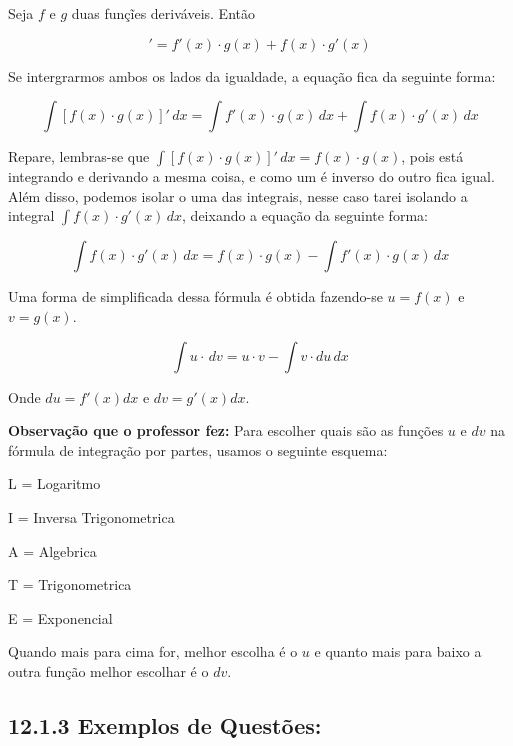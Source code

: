 \documentclass[article,12pt,oneside,a4paper,brazil]{abntex2}
\begin{document}
	\begin{flushleft}
		Seja $f$ e $g$ duas funçĩes deriváveis. Então
		
		\begin{equation*}
			[f(x) \cdot g(x)]' = f'(x) \cdot g(x) + f(x) \cdot g'(x)
		\end{equation*}
		
		Se intergrarmos ambos os lados da igualdade, a equação fica da seguinte forma:
		
		\begin{equation*}
			\int [f(x) \cdot g(x)]' \,dx = \int f'(x) \cdot g(x) \,dx + \int f(x) \cdot g'(x) \,dx
		\end{equation*}
		
		Repare, lembras-se que $\int [f(x) \cdot g(x)]' \,dx = f(x) \cdot g(x)$, pois está integrando e derivando a mesma coisa, e como um é inverso do outro fica igual. Além disso, podemos isolar o uma das integrais, nesse caso tarei isolando a integral $\int f(x) \cdot g'(x) \,dx$, deixando a equação da seguinte forma:
		
		\begin{equation*}
			\int f(x) \cdot g'(x) \,dx = f(x) \cdot g(x) - \int f'(x) \cdot g(x) \,dx
		\end{equation*}
	
		Uma forma de simplificada dessa fórmula é obtida fazendo-se $u=f(x)$ e $v=g(x)$.
		
		
		\begin{equation*}
			\int u \cdot \,dv = u \cdot v- \int v \cdot du \,dx
		\end{equation*}
	
		Onde $du = f'(x)dx$ e $dv=g'(x)dx$.
		
		\textbf{Observação que o professor fez: } Para escolher quais são as funções $u$ e $dv$ na fórmula de integração por partes, usamos o seguinte esquema:
		
		L = Logaritmo
		
		I = Inversa Trigonometrica
		
		A = Algebrica
		
		T = Trigonometrica
		
		E = Exponencial
		
		Quando mais para cima for, melhor escolha é o $u$ e quanto mais para baixo a outra função melhor escolhar é o $dv$. \\[2em]
	\end{flushleft}
	
	\subsection*{12.1.3 Exemplos de Questões: }
	
\end{document}
